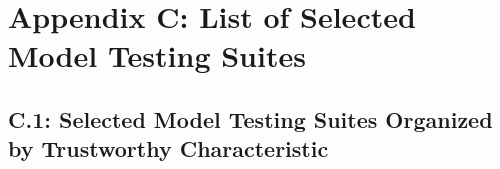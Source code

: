 \documentclass[fleqn]{article}
\begin{document}
\pagebreak

\section*{Appendix C: List of Selected Model Testing Suites}\label{sec:appndxc}\cite{aiverify_evals}


\subsection*{C.1: Selected Model Testing Suites Organized by Trustworthy Characteristic}\label{appndxc1}
\end{document}
